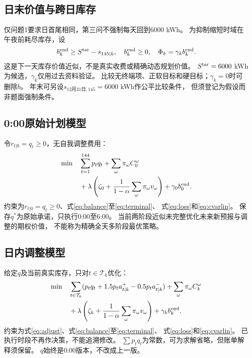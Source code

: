 \documentclass[UTF8,11pt]{ctexart}
\begin{document}
\subsection{日末价值与跨日库存}
仅问题1要求日首尾相同，第三问不强制每天回到6000 kWh。
为抑制缩短时域在午夜前耗尽库存，设
\begin{equation}\label{eq:terminal}
 b_k^{\rm end}\geq S^{\rm tar}-s_{145|k},\quad
 b_k^{\rm end}\geq0,\quad \Phi_k=\gamma_k b_k^{\rm end}.
\end{equation}
这是下一天库存价值近似，不是真实收费或精确动态规划价值。
$S^{\rm tar}=6000$ kWh为候选，$\gamma_k$仅用过去资料验证。
比较无终端项、正软目标和硬目标；$\gamma_k=0$时可删除$b$。
年末可另设$s_{\text{12月31日},145}=6000$ kWh作公平比较条件，
但须登记为假设而非题面强制条件。

\subsection{0:00原始计划模型}
令$r_{t|0}=q_t\geq0$，无自我调整费用：
\begin{equation}\label{eq:obj0}
 \begin{aligned}
 \min\quad&\sum_{t=1}^{144}p_tq_t+\sum_\omega\pi_\omega C_0^\omega\\
 &+\lambda\left(\zeta_0+\frac1{1-\alpha}\sum_\omega\pi_\omega v_\omega\right)
 +\gamma_0b_0^{\rm end}.
 \end{aligned}
\end{equation}
约束为$r_{t|0}=q_t\geq0$、式\eqref{eq:balance}至\eqref{eq:terminal}、
式\eqref{eq:loss}和\eqref{eq:cvarlin}。
保存$q^*$为原始承诺，只执行0:00至6:00。
当前两阶段近似未完整优化未来新预报与调整的期权价值，
不能称为精确全天多阶段最优策略。

\subsection{日内调整模型}
给定$q$及当前真实库存，只对$t\in\mathcal T_k$优化：
\begin{equation}\label{eq:objk}
 \begin{aligned}
 \min\quad&
 \sum_{t\in\mathcal T_k}(p_tq_t+1.5p_ta^+_{t|k}-0.5p_ta^-_{t|k})
 +\sum_\omega\pi_\omega C_k^\omega\\
 &+\lambda\left(\zeta_k+\frac1{1-\alpha}\sum_\omega\pi_\omega v_\omega\right)
 +\gamma_kb_k^{\rm end}.
 \end{aligned}
\end{equation}
约束为式\eqref{eq:adjust}、式\eqref{eq:balance}至\eqref{eq:terminal}、
式\eqref{eq:loss}和\eqref{eq:cvarlin}。
已执行时段不再作决策，不能追溯修改。
$\sum p_tq_t$为常数，可为求解省略，但账单解释须保留。
$q$始终是0:00版本，不改成上一版。
\end{document}
